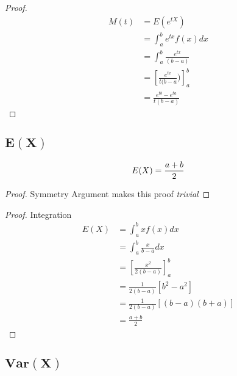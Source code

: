 \documentclass[12pt]{article}
\begin{document}
\begin{proof}
\begin{align*}
  M(t) &= E(e^{tX})\\
       &= \int_{a}^{b} e^{tx} f(x) dx \\
       &= \int_{a}^{b} \frac{e^{tx}}{(b-a)} \\
       &= \left[\frac{e^{tx}}{t(b-a}) \right]_{a}^{b} \\
       &= \frac{e^{tb}-e^{ta}}{t(b-a)}
\end{align*}
\end{proof}

\subsection{$\bm{E(X)}$}

\begin{equation*}
  E(X) = \frac{a+b}{2} \\
\end{equation*}

\begin{proof}
  Symmetry Argument makes this proof \emph{trivial}
\end{proof}

\begin{proof} Integration
  \begin{align*}
    E(X) &= \int_{a}^{b} x f(x) dx \\
         &= \int_{a}^{b} \frac{x}{b-a} dx \\
         &= \left[\frac{x^{2}}{2(b-a)}\right]_{a}^{b} \\
         &= \frac{1}{2(b-a)}[b^{2}-a^{2}] \\
         &= \frac{1}{2(b-a)}[(b-a)(b+a)] \\
         &= \frac{a+b}{2}
  \end{align*}
\end{proof}

\subsection{$\bm{Var(X)}$}
\end{document}
